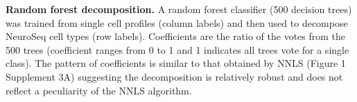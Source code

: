 \textbf{Random forest decomposition. }
A random forest classifier (500 decision trees) was trained from single cell profiles (column labels) and then used to decompose NeuroSeq cell types (row labels). Coefficients are the ratio of the votes from the 500 trees (coefficient ranges from 0 to 1 and 1 indicates all trees vote for a single class). The pattern of coefficients is similar to that obtained by NNLS (Figure 1 Supplement 3A) suggesting the decomposition is relatively robust and does not reflect a peculiarity of the NNLS algorithm.